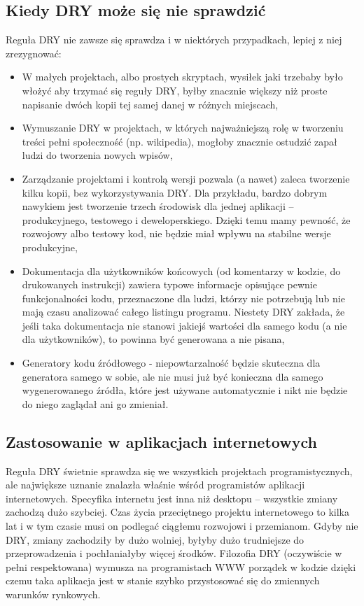 \documentclass[a4paper,12pt,oneside]{report}
\begin{document}
\subsection{Kiedy DRY może się nie sprawdzić}
\label{sub:dry-not}
Reguła DRY nie zawsze się sprawdza i w niektórych przypadkach, lepiej z niej zrezygnować:
\begin{itemize}
  \item W małych projektach, albo prostych skryptach, wysiłek jaki trzebaby było włożyć aby trzymać się reguły DRY, byłby znacznie większy niż proste napisanie dwóch kopii tej samej danej w różnych miejscach,
  \item Wymuszanie DRY w projektach, w których najważniejszą rolę w tworzeniu treści pełni społeczność (np. wikipedia), mogłoby znacznie ostudzić zapał ludzi do tworzenia nowych wpisów,
  \item Zarządzanie projektami i kontrolą wersji pozwala (a nawet) zaleca tworzenie kilku kopii, bez wykorzystywania DRY. Dla przykładu, bardzo dobrym nawykiem jest tworzenie trzech środowisk dla jednej aplikacji -- produkcyjnego, testowego i deweloperskiego. Dzięki temu mamy pewność, że rozwojowy albo testowy kod, nie będzie miał wpływu na stabilne wersje produkcyjne,
  \item Dokumentacja dla użytkowników końcowych (od komentarzy w kodzie, do drukowanych instrukcji) zawiera typowe informacje opisujące pewnie funkcjonalności kodu, przeznaczone dla ludzi, którzy nie potrzebują lub nie mają czasu analizować całego listingu programu. Niestety DRY zakłada, że jeśli taka dokumentacja nie stanowi jakiejś wartości dla samego kodu (a nie dla użytkowników), to powinna być generowana a nie pisana,
  \item Generatory kodu źródłowego - niepowtarzalność będzie skuteczna dla generatora samego w sobie, ale nie musi już być konieczna dla samego wygenerowanego źródła, które jest używane automatycznie i nikt nie będzie do niego zaglądał ani go zmieniał.
\end{itemize}

\subsection{Zastosowanie w aplikacjach internetowych}
\label{dry:web}
Reguła DRY świetnie sprawdza się we wszystkich projektach programistycznych, ale największe uznanie znalazła właśnie wśród programistów aplikacji internetowych. Specyfika internetu jest inna niż desktopu -- wszystkie zmiany zachodzą dużo szybciej. Czas życia przeciętnego projektu internetowego to kilka lat i w tym czasie musi on podlegać ciągłemu rozwojowi i przemianom. Gdyby nie DRY, zmiany zachodziły by dużo wolniej, byłyby dużo trudniejsze do przeprowadzenia i pochłaniałyby więcej środków. Filozofia DRY (oczywiście w pełni respektowana) wymusza na programistach WWW porządek w kodzie dzięki czemu taka aplikacja jest w stanie szybko przystosować się do zmiennych warunków rynkowych.
\end{document}
